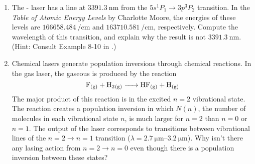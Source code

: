 \documentclass[../psets.tex]{subfiles}
\begin{document}
\begin{enumerate}
    \begin{proof}[Answer]
        The ground state as a singly degenerate $s$ orbital and the excited state as a triply degenerate $p$ orbital have degeneracies
        \begin{align*}
            g_1 &= 1&
            g_2 &= 3
        \end{align*}
        The wavelength of light absorbed in the transition is
        \begin{equation*}
            \lambda = \frac{c}{\nu} = \SI{1.218e-7}{\meter}
        \end{equation*}
        The radiative lifetime is
        \begin{equation*}
            \tau_R = \frac{1}{A} = \SI{1.6e-9}{\second}
        \end{equation*}
        Therefore, the transition dipole moment is
        \begin{align*}
            |\mu| &= \sqrt{\frac{3\epsilon_0hc^3g_2A}{16\pi^3\nu^3g_1}}\\
            \Aboxed{|\mu| &= \SI{1.1e-29}{\coulomb\meter}}
        \end{align*}
    \end{proof}
    \item The - laser has a line at $\SI{3391.3}{\nano\meter}$ from the $5s^1P_1\to 3p^3P_2$ transition. In the \emph{Table of Atomic Energy Levels} by Charlotte Moore, the energies of these levels are $\SI{166658.484}{\per\centi\meter}$ and $\SI{163710.581}{\per\centi\meter}$, respectively. Compute the wavelength of this transition, and explain why the result is not $\SI{3391.3}{\nano\meter}$. (Hint: Consult Example 8-10 in \textcite{bib:McQuarrieSimon}.)
    \item Chemical lasers generate population inversions through chemical reactions. In the  gas laser, the gaseous  is produced by the reaction
    \begin{equation*}
        \ce{F_{(g)} + H2_{(g)} -> HF_{(g)} + H_{(g)}}
    \end{equation*}
    The major product of this reaction is  in the excited $n=2$ vibrational state. The reaction creates a population inversion in which $N(n)$, the number of molecules in each vibrational state $n$, is much larger for $n=2$ than $n=0$ or $n=1$. The output of the  laser corresponds to transitions between vibrational lines of the $n=2\to n=1$ transition ($\lambda=\SIrange{2.7}{3.2}{\micro\meter}$). Why isn't there any lasing action from $n=2\to n=0$ even though there is a population inversion between these states?
\end{enumerate}
\end{document}
